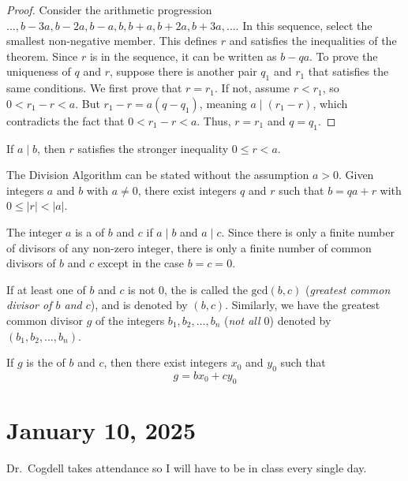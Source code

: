 \documentclass[11pt]{article}
\begin{document}
\begin{proof}
	Consider the arithmetic progression $\ldots, b - 3a, b - 2a, b - a, b, b + a, b + 2a, b + 3a, \ldots$. In this sequence, select the smallest non-negative member. This defines $r$ and satisfies the inequalities of the theorem. Since $r$ is in the sequence, it can be written as $b - qa$. To prove the uniqueness of $q$ and $r$, suppose there is another pair $q_1$ and $r_1$ that satisfies the same conditions. We first prove that $r = r_1$. If not, assume $r < r_1$, so $0 < r_1 - r < a$. But $r_1 - r = a(q - q_1)$, meaning $a \mid (r_1 - r)$, which contradicts the fact that $0 < r_1 - r < a$. Thus, $r = r_1$ and $q = q_1$.
\end{proof}

\begin{fact}
	If $a \mid b$, then $r$ satisfies the stronger inequality $0 \leq r < a$.
\end{fact}

\begin{fact}
	The Division Algorithm can be stated without the assumption $a > 0$. Given integers $a$ and $b$ with $a \neq 0$, there exist integers $q$ and $r$ such that $b = qa + r$ with $0 \leq |r| < |a|$.
\end{fact}

\begin{definition}
	The integer $a$ is a  of $b$ and $c$ if $a \mid b$ and $a \mid c$. Since there is only a finite number of divisors of any non-zero integer, there is only a finite number of common divisors of $b$ and $c$ except in the case $b = c = 0$.
\end{definition}

If at least one of \( b \) and \( c \) is not \( 0 \), the  is called the  \( \text{gcd}(b, c) \)
(\textit{greatest common divisor of \( b \) and \( c \)}), and is denoted by \(
(b, c) \). Similarly, we have the greatest common divisor \( g \) of the
integers \( b_1, b_2, \ldots, b_n \) (\textit{not all \( 0 \)}) denoted by \(
(b_1, b_2, \ldots, b_n) \).

\begin{theorem}\label{1.3}
	If $g$ is the  of \( b \) and \( c \), then there exist integers \( x_0 \) and \( y_0 \) such that \[g = bx_0 + cy_0\]
\end{theorem}

\section{January 10, 2025}
Dr.\ Cogdell takes attendance so I will have to be in class every single day.
\end{document}
